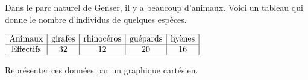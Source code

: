 \begin{exercice*}
    Dans le parc naturel de Genser, il y a beaucoup d'animaux.
    Voici un tableau qui donne le nombre d'individus de quelques espèces.
    
    \smallskip
    $
    \begin{array}{|c|c|c|c|c|}
    \hline
    \text{Animaux} & \text{girafes} & \text{rhinocéros} & \text{guépards} & \text{hyènes}\\
    \hline
    \text{Effectifs} & 32 & 12 & 20 & 16\\
    \hline
    \end{array}
    $
    
    
    \smallskip
    Représenter ces données par un graphique cartésien.   
    
\end{exercice*}
